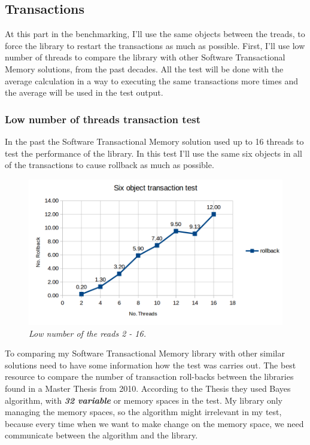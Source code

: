 \documentclass[12pt]{article}
\begin{document}
\newpage
\subsection{Transactions}
At this part in the benchmarking, I'll use the same objects between the treads, to force the library to restart the transactions as much as possible. First, I'll use low number of threads to compare the library with other Software Transactional Memory solutions, from the past decades. All the test will be done with the average calculation in a way to executing the same transactions more times and the average will be used in the test output.

\subsubsection{Low number of threads transaction test}
In the past the Software Transactional Memory solution used up to 16 threads to test the performance of the library. In this test I'll use the same six objects in all of the transactions to cause rollback as much as possible.

\begin{figure}[h!]
\centering
\includegraphics[scale=0.4]{Pictures/base_transaction.png}
\caption*{\textit{\color{gray}Low number of the reads 2 - 16.}}
\end{figure}


\newpage
To comparing my Software Transactional Memory library with other similar solutions need to have some information how the test was carries out. The best resource to compare the number of transaction roll-backs between the libraries found in a Master Thesis\cite{Performance}  from 2010. According to the Thesis they used Bayes algorithm, with \textbf{\textit{32 variable}}\cite{Performance} or memory spaces in the test. My library only managing the memory spaces, so the algorithm might irrelevant in my test, because every time when we want to make change on the memory space, we need communicate between the algorithm and the library.
\end{document}
